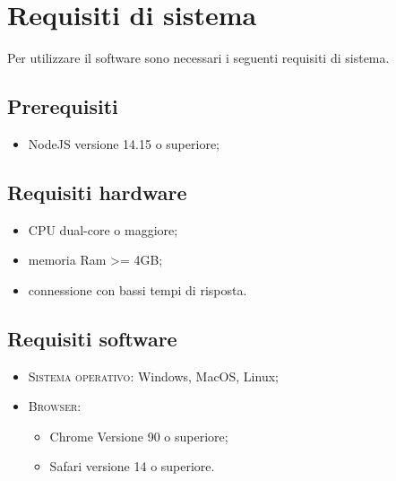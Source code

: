 \section{Requisiti di sistema}
Per utilizzare il software sono necessari i seguenti requisiti di sistema.
\subsection{Prerequisiti}
    \begin{itemize}
        \item NodeJS versione 14.15 o superiore;
    \end{itemize}
\subsection{Requisiti hardware}
\begin{itemize}
	\item CPU dual-core o maggiore;
	\item memoria Ram >= 4GB;
	\item connessione con bassi tempi di risposta.
\end{itemize}
\subsection{Requisiti software}
\begin{itemize}
    \item \textsc{Sistema operativo}: Windows, MacOS, Linux;
    \item \textsc{Browser}: 
    \begin{itemize}
        \item Chrome Versione 90 o superiore;
        \item Safari versione 14 o superiore.
    \end{itemize}
\end{itemize}